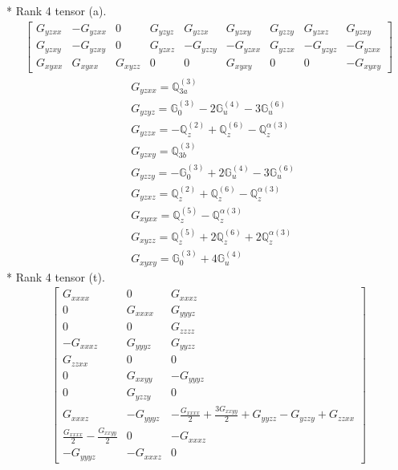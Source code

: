 \documentclass[fleqn,8pt,landscape]{jsarticle}
\begin{document}
* Rank 4 tensor (a).
\begin{align*}
\begin{bmatrix} G_{yzxx} & - G_{yzxx} & 0 & G_{yzyz} & G_{yzzx} & G_{yzxy} & G_{yzzy} & G_{yzxz} & G_{yzxy} \\ G_{yzxy} & - G_{yzxy} & 0 & G_{yzxz} & - G_{yzzy} & - G_{yzxx} & G_{yzzx} & - G_{yzyz} & - G_{yzxx} \\ G_{xyxx} & G_{xyxx} & G_{xyzz} & 0 & 0 & G_{xyxy} & 0 & 0 & - G_{xyxy} \end{bmatrix}
\end{align*}
\begin{align*}
& G_{yzxx} = \mathbb{Q}_{3a}^{(3)} \\
& G_{yzyz} = \mathbb{G}_{0}^{(3)} - 2 \mathbb{G}_{u}^{(4)} - 3 \mathbb{G}_{u}^{(6)} \\
& G_{yzzx} = - \mathbb{Q}_{z}^{(2)} + \mathbb{Q}_{z}^{(6)} - \mathbb{Q}_{z}^{\alpha(3)} \\
& G_{yzxy} = \mathbb{Q}_{3b}^{(3)} \\
& G_{yzzy} = - \mathbb{G}_{0}^{(3)} + 2 \mathbb{G}_{u}^{(4)} - 3 \mathbb{G}_{u}^{(6)} \\
& G_{yzxz} = \mathbb{Q}_{z}^{(2)} + \mathbb{Q}_{z}^{(6)} - \mathbb{Q}_{z}^{\alpha(3)} \\
& G_{xyxx} = \mathbb{Q}_{z}^{(5)} - \mathbb{Q}_{z}^{\alpha(3)} \\
& G_{xyzz} = \mathbb{Q}_{z}^{(5)} + 2 \mathbb{Q}_{z}^{(6)} + 2 \mathbb{Q}_{z}^{\alpha(3)} \\
& G_{xyxy} = \mathbb{G}_{0}^{(3)} + 4 \mathbb{G}_{u}^{(4)}
\end{align*}
* Rank 4 tensor (t).
\begin{align*}
\begin{bmatrix} G_{xxxx} & 0 & G_{xxxz} \\ 0 & G_{xxxx} & G_{yyyz} \\ 0 & 0 & G_{zzzz} \\ - G_{xxxz} & G_{yyyz} & G_{yyzz} \\ G_{zzxx} & 0 & 0 \\ 0 & G_{xxyy} & - G_{yyyz} \\ 0 & G_{yzzy} & 0 \\ G_{xxxz} & - G_{yyyz} & - \frac{G_{xxxx}}{2} + \frac{3 G_{xxyy}}{2} + G_{yyzz} - G_{yzzy} + G_{zzxx} \\ \frac{G_{xxxx}}{2} - \frac{G_{xxyy}}{2} & 0 & - G_{xxxz} \\ - G_{yyyz} & - G_{xxxz} & 0 \end{bmatrix}
\end{align*}
\end{document}
